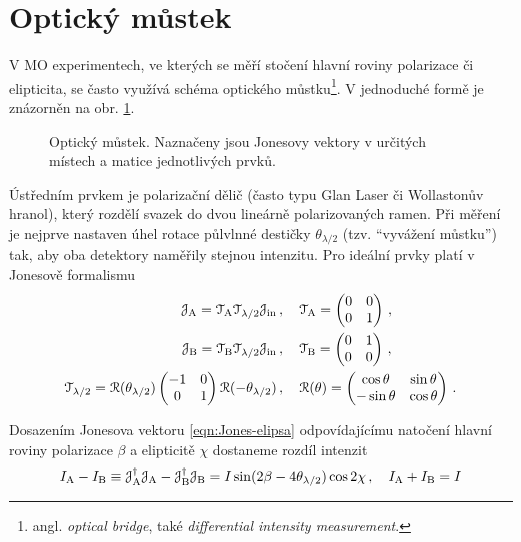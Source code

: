 \section{Optický můstek}
\label{chap:mustek-kap2}
V MO experimentech, ve kterých se měří stočení hlavní roviny polarizace či elipticita, se často využívá schéma optického můstku\footnote{angl. \emph{optical bridge}, také \emph{differential intensity measurement}.}\cite{silberQuadraticMagnetoopticKerr2019a}.
V jednoduché formě je znázorněn na obr. \ref{fig:mustek-schema}.

\begin{figure}[htbp]
    \centering
    
    \caption{Optický můstek. Naznačeny jsou Jonesovy vektory v určitých místech a matice jednotlivých prvků.}
    \label{fig:mustek-schema}
\end{figure}

Ústředním prvkem je polarizační dělič (často typu Glan Laser či Wollastonův hranol), který rozdělí svazek do dvou lineárně polarizovaných ramen.
Při měření je nejprve nastaven úhel rotace půlvlnné destičky $\theta_{\lambda/2}$ (tzv. ``vyvážení můstku'') tak, aby oba detektory naměřily stejnou intenzitu.
Pro ideální prvky platí v Jonesově formalismu
\begin{align}
    \mathcal{J}_\textrm{A} = \mathcal{T}_\textrm{A} \mathcal{T}_{\lambda/2} \mathcal{J}_\textrm{in} \,&, \quad 
    \mathcal{T}_\textrm{A}=\begin{pmatrix} 0&0\\0&1 \end{pmatrix} \,, \\
    \mathcal{J}_\textrm{B} = \mathcal{T}_\textrm{B} \mathcal{T}_{\lambda/2} \mathcal{J}_\textrm{in} \,&, \quad
    \mathcal{T}_\textrm{B}=\begin{pmatrix} 0&1\\0&0 \end{pmatrix} \,,\\
    \mathcal{T}_{\lambda/2}=\mathcal{R}(\theta_{\lambda/2})\begin{pmatrix} -1&0\\0&1 \end{pmatrix}\mathcal{R}(-\theta_{\lambda/2}) \,&, \quad
    \mathcal{R}(\theta)=\begin{pmatrix} \cos\theta&\sin\theta\\-\sin\theta&\cos\theta \end{pmatrix} \,.
\end{align}

Dosazením Jonesova vektoru \eqref{eqn:Jones-elipsa} odpovídajícímu natočení hlavní roviny polarizace $\beta$ a elipticitě $\chi$ dostaneme rozdíl intenzit
\begin{equation}
    I_\textrm{A}-I_\textrm{B}\equiv\mathcal{J}_\textrm{A}^\dagger\mathcal{J}_\textrm{A}-\mathcal{J}_\textrm{B}^\dagger\mathcal{J}_\textrm{B}=I\sin(2\beta-4\theta_{\lambda/2})\cos2\chi \,, \quad I_\textrm{A}+I_\textrm{B}=I
\end{equation}

